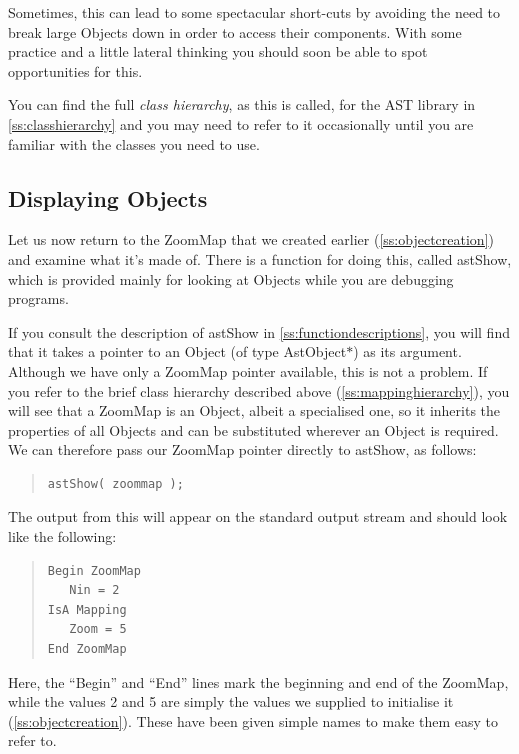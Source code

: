 \documentclass[twoside,11pt]{article}
\newcommand{\htmlref}[2]{#1}
\newcommand{\appref}[1]{Appendix~\ref{#1}}
\newcommand{\secref}[1]{\S\ref{#1}}
\renewcommand{\appref}[1]{\ref{#1}}
\renewcommand{\secref}[1]{\ref{#1}}
\begin{document}
Sometimes, this can lead to some spectacular short-cuts by avoiding
the need to break large Objects down in order to access their
components. With some practice and a little lateral thinking you
should soon be able to spot opportunities for this.

You can find the full {\em{class hierarchy}}, as this is called, for
the AST library in \appref{ss:classhierarchy} and you may need to
refer to it occasionally until you are familiar with the classes you
need to use.

\subsection{\label{ss:displayingobjects}Displaying Objects}

Let us now return to the \htmlref{ZoomMap}{ZoomMap} that we created earlier
(\secref{ss:objectcreation}) and examine what it's made of.
There is a function for doing this, called \htmlref{astShow}{astShow}, which is provided
mainly for looking at Objects while you are debugging programs.

If you consult the description of astShow in
\appref{ss:functiondescriptions}, you will find that it takes a
pointer to an \htmlref{Object}{Object} (of type AstObject$*$) as its argument. Although
we have only a ZoomMap pointer available, this is not a problem. If
you refer to the brief class hierarchy described above
(\secref{ss:mappinghierarchy}), you will see that a ZoomMap is an
Object, albeit a specialised one, so it inherits the properties of all
Objects and can be substituted wherever an Object is required.  We can
therefore pass our ZoomMap pointer directly to astShow, as follows:

\begin{quote}
\small
\begin{verbatim}
astShow( zoommap );
\end{verbatim}
\normalsize
\end{quote}

The output from this will appear on the standard output stream and
should look like the following:

\begin{quote}
\small
\begin{verbatim}
Begin ZoomMap
   Nin = 2
IsA Mapping
   Zoom = 5
End ZoomMap
\end{verbatim}
\normalsize
\end{quote}

Here, the ``Begin'' and ``End'' lines mark the beginning and end of
the ZoomMap, while the values 2 and 5 are simply the values we
supplied to initialise it (\secref{ss:objectcreation}). These have
been given simple names to make them easy to refer to.
\end{document}
